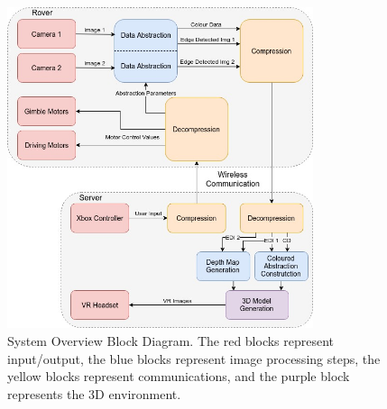 \begin{figure}[H]
    \begin{center}
      \includegraphics[width=0.8\textwidth]{Figures/System.jpg}
      \caption[System Overview Block Diagram]{System Overview Block Diagram. The red blocks represent input/output, the blue blocks represent image processing steps, the yellow blocks represent communications, and the purple block represents the 3D environment.}
      \label{fig:system}
    \end{center}
\end{figure}